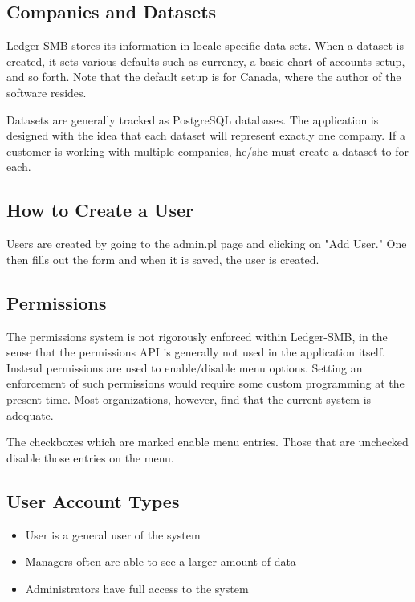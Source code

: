 \documentclass{article}
\begin{document}
\subsection{Companies and Datasets}

Ledger-SMB stores its information in locale-specific data sets.  When a dataset
is created, it sets various defaults such as currency, a basic chart of accounts
setup, and so forth.  Note that the default setup is for Canada, where the
author of the software resides.

Datasets are generally tracked as PostgreSQL databases.  The application is
designed with the idea that each dataset will represent exactly one company.  If
a customer is working with multiple companies, he/she must create a dataset to
for each.

\subsection{How to Create a User}

Users are created by going to the admin.pl page and clicking on "Add User."  One
then fills out the form and when it is saved, the user is created.

\subsection{Permissions}

The permissions system is not rigorously enforced within Ledger-SMB, in the
sense that the permissions API is generally not used in the application itself.
Instead permissions are used to enable/disable menu options.  Setting an
enforcement of such permissions would require some custom programming at the
present time.  Most organizations, however, find that the current system is
adequate.

The checkboxes which are marked enable menu entries.  Those that are unchecked
disable those entries on the menu.

\subsection{User Account Types}

\begin{itemize}
\item User is a general user of the system
\item Managers often are able to see a larger amount of data
\item Administrators have full access to the system
\end{itemize}
\end{document}
